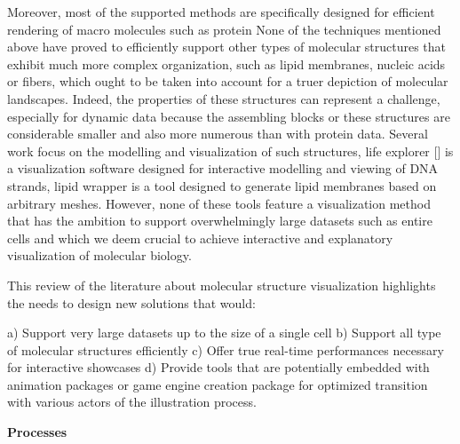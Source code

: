 Moreover, most of the supported methods are specifically designed for efficient rendering of macro molecules such as protein
None of the techniques mentioned above have proved to efficiently support other types of molecular structures that exhibit much more complex organization, such as lipid membranes, nucleic acids or fibers, which ought to be taken into account for a truer depiction of molecular landscapes.
Indeed, the properties of these structures can represent a challenge, especially for dynamic data because the assembling blocks or these structures are considerable smaller and also more numerous than with protein data.
Several work focus on the modelling and visualization of such structures, life explorer [] is a visualization software designed for interactive modelling and viewing of DNA strands, lipid wrapper is a tool designed to generate lipid membranes based on arbitrary meshes.
However, none of these tools feature a visualization method that has the ambition to support overwhelmingly large datasets such as entire cells and which we deem crucial to achieve interactive and explanatory visualization of molecular biology.

This review of the literature about molecular structure visualization highlights the needs to design new solutions that would:

a) Support very large datasets up to the size of a single cell
b) Support all type of molecular structures efficiently
c) Offer true real-time performances necessary for interactive showcases
d) Provide tools that are potentially embedded with animation packages or game engine creation package for optimized transition with various actors of the illustration process.


\textbf{Processes}


